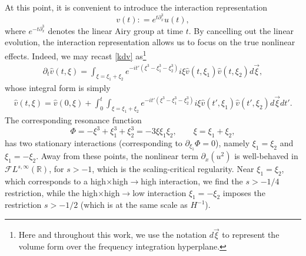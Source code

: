 \documentclass[%
11pt,  reqno]{amsart}
\newcommand{\5}{\textup{V}}
\newcommand{\FL}{\mathcal{F} L}
\DeclareMathOperator*{\intt}{\int}
\newcommand{\dx}{\partial_x}
\newcommand{\dt}{\partial_t}
\theoremstyle{remark}
\newcommand{\R}{\mathbb{R}}
\numberwithin{equation}{section}
\numberwithin{theorem}{section}
\begin{document}
	\medskip
	At this point, it is convenient to introduce the interaction representation
	\begin{equation}\label{inter}
		v(t) : = e^{t\partial_x^3}u(t),
	\end{equation} 
	where $e^{-t\dx^3}$ denotes the linear Airy group at time $t$. By cancelling out the linear evolution, the interaction representation allows us to focus on the true nonlinear effects. Indeed, we may recast \eqref{kdv} as\footnote{Here and throughout this work, we use the notation $d\vec{\xi}$ to represent the volume form over the frequency integration hyperplane.}
	\begin{align}
		\label{dtv}
		\dt{\widehat{v}}(t,\xi) = \intt_{\xi = \xi_1+\xi_2} e^{-it' (\xi^3 -\xi_1^3 -
			\xi^3_2)} i \xi \widehat{v}(t,\xi_1) \widehat{v}(t,\xi_2)  d\vec{\xi}
		,
	\end{align}
	whose integral form is simply
	\begin{align}
		\label{duhamel}
		\widehat{v}(t, \xi ) = \widehat{v}(0,\xi) + \int_0^t \intt_{\xi=\xi_1+\xi_2}e^{-it' (\xi^3 -
			\xi_1^3 - \xi_2^3) } i\xi \widehat{v}(t', \xi_1) \widehat{v}(t',\xi_2) d\vec{\xi} dt'.
	\end{align}
	The corresponding resonance function
	\begin{equation}
		\Phi=-\xi^3+\xi_1^3+\xi_2^3 = -3\xi\xi_1\xi_2, \qquad \xi=\xi_1+\xi_2,
	\end{equation}
	has two stationary interactions (corresponding to $\partial_{\xi_1}\Phi=0$), namely $\xi_1=\xi_2$ and $\xi_1=-\xi_2$. Away from these points, the nonlinear term $\partial_x(u^2)$ is well-behaved in $\FL^{s,\infty}(\R)$,
	for $s>-1$, which is the scaling-critical regularity. 
	Near $\xi_1=\xi_2$, which corresponds to a  high$\times$high$\to$high interaction, we find the $s>-1/4$ restriction, while the  high$\times$high$\to$low interaction $\xi_1=-\xi_2$ imposes the restriction $s>-1/2$ (which is at the same scale as $H^{-1}$).
	
\end{document}
